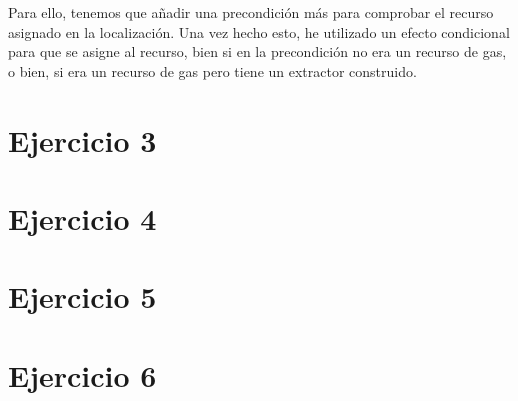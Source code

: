 \documentclass[11pt,a4paper]{article}
\begin{document}
Para ello, tenemos que añadir una precondición más para comprobar el recurso asignado en la localización. Una vez hecho esto, he
utilizado un efecto condicional para que se asigne al recurso, bien si en la precondición no era un recurso de gas, o bien, si
era un recurso de gas pero tiene un extractor construido.


\section*{Ejercicio 3}




\section*{Ejercicio 4}


\section*{Ejercicio 5}


\section*{Ejercicio 6}
\end{document}
